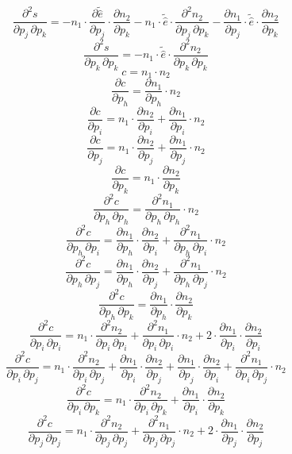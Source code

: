 \[ \frac{\partial^2 s}{\partial p_{j}\,\partial p_{k}} = - n_1 \cdot \frac{\partial \tilde{\hat{e}}}{\partial p_{j}} \cdot \frac{\partial n_2}{\partial p_{k}} - n_1 \cdot \tilde{\hat{e}} \cdot \frac{\partial^{2} n_2}{\partial p_{j}\,\partial p_{k}} - \frac{\partial n_1}{\partial p_{j}} \cdot \tilde{\hat{e}} \cdot \frac{\partial n_2}{\partial p_{k}} \]
\[ \frac{\partial^2 s}{\partial p_{k}\,\partial p_{k}} = - n_1 \cdot \tilde{\hat{e}} \cdot \frac{\partial^{2} n_2}{\partial p_{k}\,\partial p_{k}} \]
\[ c = n_1 \cdot n_2 \]
\[ \frac{\partial c}{\partial p_{h}} = \frac{\partial n_1}{\partial p_{h}} \cdot n_2 \]
\[ \frac{\partial c}{\partial p_{i}} = n_1 \cdot \frac{\partial n_2}{\partial p_{i}} + \frac{\partial n_1}{\partial p_{i}} \cdot n_2 \]
\[ \frac{\partial c}{\partial p_{j}} = n_1 \cdot \frac{\partial n_2}{\partial p_{j}} + \frac{\partial n_1}{\partial p_{j}} \cdot n_2 \]
\[ \frac{\partial c}{\partial p_{k}} = n_1 \cdot \frac{\partial n_2}{\partial p_{k}} \]
\[ \frac{\partial^2 c}{\partial p_{h}\,\partial p_{h}} = \frac{\partial^{2} n_1}{\partial p_{h}\,\partial p_{h}} \cdot n_2 \]
\[ \frac{\partial^2 c}{\partial p_{h}\,\partial p_{i}} = \frac{\partial n_1}{\partial p_{h}} \cdot \frac{\partial n_2}{\partial p_{i}} + \frac{\partial^{2} n_1}{\partial p_{h}\,\partial p_{i}} \cdot n_2 \]
\[ \frac{\partial^2 c}{\partial p_{h}\,\partial p_{j}} = \frac{\partial n_1}{\partial p_{h}} \cdot \frac{\partial n_2}{\partial p_{j}} + \frac{\partial^{2} n_1}{\partial p_{h}\,\partial p_{j}} \cdot n_2 \]
\[ \frac{\partial^2 c}{\partial p_{h}\,\partial p_{k}} = \frac{\partial n_1}{\partial p_{h}} \cdot \frac{\partial n_2}{\partial p_{k}} \]
\[ \frac{\partial^2 c}{\partial p_{i}\,\partial p_{i}} = n_1 \cdot \frac{\partial^{2} n_2}{\partial p_{i}\,\partial p_{i}} + \frac{\partial^{2} n_1}{\partial p_{i}\,\partial p_{i}} \cdot n_2 + 2 \cdot \frac{\partial n_1}{\partial p_{i}} \cdot \frac{\partial n_2}{\partial p_{i}} \]
\[ \frac{\partial^2 c}{\partial p_{i}\,\partial p_{j}} = n_1 \cdot \frac{\partial^{2} n_2}{\partial p_{i}\,\partial p_{j}} + \frac{\partial n_1}{\partial p_{i}} \cdot \frac{\partial n_2}{\partial p_{j}} + \frac{\partial n_1}{\partial p_{j}} \cdot \frac{\partial n_2}{\partial p_{i}} + \frac{\partial^{2} n_1}{\partial p_{i}\,\partial p_{j}} \cdot n_2 \]
\[ \frac{\partial^2 c}{\partial p_{i}\,\partial p_{k}} = n_1 \cdot \frac{\partial^{2} n_2}{\partial p_{i}\,\partial p_{k}} + \frac{\partial n_1}{\partial p_{i}} \cdot \frac{\partial n_2}{\partial p_{k}} \]
\[ \frac{\partial^2 c}{\partial p_{j}\,\partial p_{j}} = n_1 \cdot \frac{\partial^{2} n_2}{\partial p_{j}\,\partial p_{j}} + \frac{\partial^{2} n_1}{\partial p_{j}\,\partial p_{j}} \cdot n_2 + 2 \cdot \frac{\partial n_1}{\partial p_{j}} \cdot \frac{\partial n_2}{\partial p_{j}} \]

